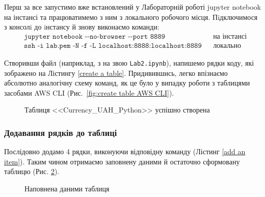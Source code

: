 \documentclass[a4paper,14pt]{extarticle} %
\begin{document}
Перш за все запустимо вже встановлений у Лабораторній роботі  jupyter notebook на інстансі та 
працюватимемо з ним з локального робочого місця. Пiдключимося з консолi до iнстансу й знову виконаємо команди:
\begin{align*}
    &\texttt{jupyter notebook {-}{-}no-browser {-}{-}port 8889} && \text{на інстансі} \\
    &\texttt{ssh -i lab.pem -N -f -L localhost:8888:localhost:8889} && \text{локально}
\end{align*}

Створивши файл (наприклад, з на звою \texttt{Lab2.ipynb}), напишемо рядки коду, які зображено на Лістингу 
\ref{create a table}. Придивившись, легко впізнаємо абсолютно аналогічну схему команд, як це було у випадку 
роботи з таблицями засобами AWS CLI (Рис.~\ref{fig:create table AWS CLI}).



\begin{figure}[H]
    \caption{Таблиця <<Currency\_UAH\_Python>> успішно створена}
    \label{fig:table Python}
\end{figure}

\subsubsection*{Додавання рядків до таблиці}

Послідовно додамо 4 рядки, виконуючи відповідну команду (Лістинг \ref{add an item}). Таким чином отримаємо 
заповнену даними й остаточно сформовану таблицю (Рис. \ref{fig:full table Python}).



\begin{figure}[H]
    \caption{Наповнена даними таблиця}
    \label{fig:full table Python}
\end{figure}
\end{document}
